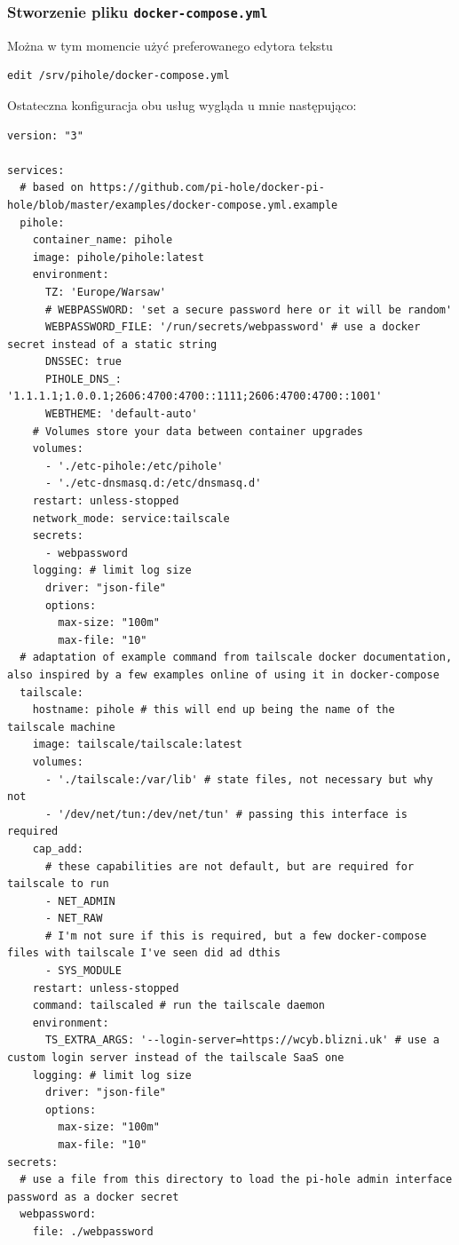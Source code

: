 \documentclass[../main.tex]{subfiles}
\begin{document}
\subsubsection{Stworzenie pliku \texttt{docker-compose.yml}}
Można w tym momencie użyć preferowanego edytora tekstu
\begin{verbatim}
edit /srv/pihole/docker-compose.yml
\end{verbatim}
\begin{samepage}
Ostateczna konfiguracja obu usług wygląda u mnie następująco:
\begin{verbatim}
version: "3"

services:
  # based on https://github.com/pi-hole/docker-pi-hole/blob/master/examples/docker-compose.yml.example
  pihole:
    container_name: pihole
    image: pihole/pihole:latest
    environment:
      TZ: 'Europe/Warsaw'
      # WEBPASSWORD: 'set a secure password here or it will be random'
      WEBPASSWORD_FILE: '/run/secrets/webpassword' # use a docker secret instead of a static string
      DNSSEC: true
      PIHOLE_DNS_: '1.1.1.1;1.0.0.1;2606:4700:4700::1111;2606:4700:4700::1001'
      WEBTHEME: 'default-auto'
    # Volumes store your data between container upgrades
    volumes:
      - './etc-pihole:/etc/pihole'
      - './etc-dnsmasq.d:/etc/dnsmasq.d'
    restart: unless-stopped
    network_mode: service:tailscale
    secrets:
      - webpassword
    logging: # limit log size
      driver: "json-file"
      options:
        max-size: "100m"
        max-file: "10"
  # adaptation of example command from tailscale docker documentation, also inspired by a few examples online of using it in docker-compose
  tailscale:
    hostname: pihole # this will end up being the name of the tailscale machine
    image: tailscale/tailscale:latest
    volumes:
      - './tailscale:/var/lib' # state files, not necessary but why not
      - '/dev/net/tun:/dev/net/tun' # passing this interface is required
    cap_add:
      # these capabilities are not default, but are required for tailscale to run
      - NET_ADMIN
      - NET_RAW
      # I'm not sure if this is required, but a few docker-compose files with tailscale I've seen did ad dthis
      - SYS_MODULE
    restart: unless-stopped
    command: tailscaled # run the tailscale daemon
    environment:
      TS_EXTRA_ARGS: '--login-server=https://wcyb.blizni.uk' # use a custom login server instead of the tailscale SaaS one
    logging: # limit log size
      driver: "json-file"
      options:
        max-size: "100m"
        max-file: "10"
secrets:
  # use a file from this directory to load the pi-hole admin interface password as a docker secret
  webpassword:
    file: ./webpassword
\end{verbatim}
\end{samepage}
\end{document}
